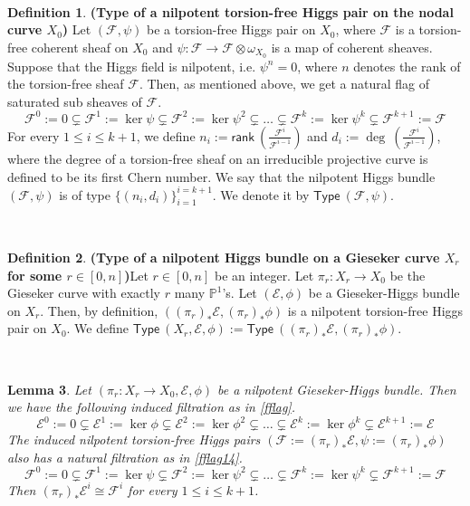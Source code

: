 \documentclass[11pt]{amsart}
\newcommand {\Type} {\textsf{Type}}
\newcommand  {\rank}     {\textsf{rank}}
\theoremstyle{plain}
\numberwithin{equation}{section}
\theoremstyle{definition}
\newtheorem{Def}{Definition}[section]
\theoremstyle{plain}
\newtheorem{Lem}[Def]{Lemma}
\begin{document}
\

\begin{Def}\textbf{(Type of a nilpotent torsion-free Higgs pair on the nodal curve $X_0$)}
Let $(\mathcal F, \psi)$ be a torsion-free Higgs pair on $X_0$, where $\mathcal F$ is a torsion-free coherent sheaf on $X_0$ and $\psi: \mathcal F\longrightarrow \mathcal F\otimes \omega_{X_0}$ is a map of coherent sheaves. Suppose that the Higgs field is nilpotent, i.e. $\psi^n=0$, where $n$ denotes the rank of the torsion-free sheaf $\mathcal F$. Then, as mentioned above, we get a natural flag of saturated sub sheaves of $\mathcal F$.
\begin{equation}\label{fflag14}
    \mathcal F^0:=0\subsetneq \mathcal F^1:=\ker \psi\subsetneq \mathcal F^{2}:=\ker \psi^{2} \subsetneq \dots\subsetneq \mathcal F^k:=\ker \psi^k\subsetneq \mathcal F^{k+1}:=\mathcal F
\end{equation}
For every $1\leq i\leq k+1$, we define $n_i:=\rank ~\left(\frac{\mathcal F^{i}}{\mathcal F^{i-1}}\right)$ and $d_i:=\deg~ \left(\frac{\mathcal F^{i}}{\mathcal F^{i-1}}\right)$, where the degree of a torsion-free sheaf on an irreducible projective curve is defined to be its first Chern number. We say that the nilpotent Higgs bundle $(\mathcal F, \psi)$ is of type $\{(n_i, d_i)\}^{i=k+1}_{i=1}$. We denote it by $\Type~(\mathcal F, \psi)$. 
\end{Def}

\

\begin{Def}\textbf{(Type of a nilpotent Higgs bundle on a Gieseker curve $X_r$ for some $r\in [0,n]$)}\label{Type}
Let $r\in [0,n]$ be an integer. Let $\pi_r:X_r\longrightarrow X_0$ be the Gieseker curve with exactly $r$ many $\mathbb P^1$'s. Let $(\mathcal E, \phi)$ be a Gieseker-Higgs bundle on $X_r$. Then, by definition, $((\pi_r)_*\mathcal E, (\pi_r)_*\phi)$ is a nilpotent torsion-free Higgs pair on $X_0$. We define $\Type~(X_r, \mathcal E, \phi):=\Type~((\pi_r)_*\mathcal E, (\pi_r)_*\phi)$.
\end{Def}

\

\begin{Lem}\label{pushforward1122}
    Let $(\pi_r: X_r\rightarrow X_0, \mathcal E, \phi)$ be a nilpotent Gieseker-Higgs bundle. Then we have the following induced filtration as in \eqref{fflag}.
    \begin{equation}
        \mathcal E^0:=0\subsetneq \mathcal E^1:=\ker \phi\subsetneq \mathcal E^{2}:=\ker \phi^{2} \subsetneq \dots\subsetneq \mathcal E^k:=\ker \phi^k\subsetneq \mathcal E^{k+1}:=\mathcal E
    \end{equation}
    The induced nilpotent torsion-free Higgs pairs $(\mathcal F:=(\pi_r)_*\mathcal E, \psi:=(\pi_r)_*\phi)$ also has a natural filtration as in \eqref{fflag14}. 
    \begin{equation}
    \mathcal F^0:=0\subsetneq \mathcal F^1:=\ker  \psi\subsetneq \mathcal F^{2}:=\ker \psi^{2} \subsetneq \dots\subsetneq \mathcal F^k:=\ker  \psi^k\subsetneq \mathcal F^{k+1}:=\mathcal F
\end{equation}
Then $(\pi_r)_*\mathcal E^i\cong \mathcal F^i$ for every $1\leq i\leq k+1$.
\end{Lem}
\end{document}

